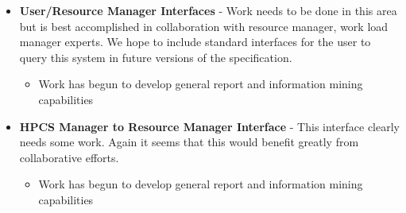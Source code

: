\begin{itemize}[noitemsep,nolistsep]
{}
\item{\textbf{User/Resource Manager Interfaces} - Work needs to be done in this area but is best accomplished in collaboration with resource manager, work load manager experts. We hope to include standard interfaces for the user to query this system in future versions of the specification. 
}
    \begin{itemize}
        \item{Work has begun to develop general report and information mining capabilities}
    \end{itemize}

\item{\textbf{HPCS Manager to Resource Manager Interface} - This interface clearly needs some work. Again it seems that this would benefit greatly from collaborative efforts.
}
    \begin{itemize}
        \item{Work has begun to develop general report and information mining capabilities}
    \end{itemize}

\end{itemize}
